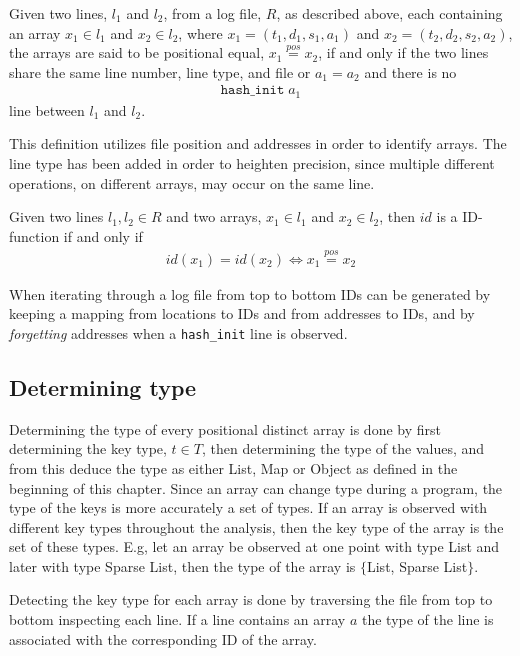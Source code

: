 \begin{definition}
Given two lines, $l_1$ and $l_2$, from a log file, $R$, as described above, each containing an array $x_1\in l_1$ and $x_2\in l_2$, where $x_1 = (t_1,d_1,s_1,a_1)$ and $x_2 = (t_2,d_2,s_2,a_2)$, the arrays are said to be positional equal, $x_1\stackrel{pos}{=} x_2$, if and only if the two lines share the same line number, line type, and file or $a_1 = a_2$ and there is no 
\begin{align*}
\texttt{hash\_init}\;a_1
\end{align*}
line between $l_1$ and $l_2$.
\end{definition}

This definition utilizes file position and addresses in order to identify arrays. The line type has been added in order to heighten precision, since multiple different operations, on different arrays, may occur on the same line. 

\begin{definition}
Given two lines $l_1, l_2\in R$ and two arrays, $x_1\in l_1$ and $x_2 \in l_2$, then $id$ is a ID-function if and only if
\begin{align*}
    id(x_1) = id(x_2) \Leftrightarrow x_1 \stackrel{pos}{=} x_2
\end{align*}
\end{definition}

When iterating through a log file from top to bottom IDs can be generated by keeping a mapping from locations to IDs and from addresses to IDs, and by \emph{forgetting} addresses when a \texttt{hash\_init} line is observed.

\subsection{Determining type}
Determining the type of every positional distinct array is done by first determining the key type, $t\in T$, then determining the type of the values, and from this deduce the type as either List, Map or Object as defined in the beginning of this chapter. Since an array can change type during a program, the type of the keys is more accurately a set of types. If an array is observed with different key types throughout the analysis, then the key type of the array is the set of these types. E.g, let an array be observed at one point with type List and later with type Sparse List, then the type of the array is $\{$List, Sparse List$\}$.

Detecting the key type for each array is done by traversing the file from top to bottom inspecting each line. If a line contains an array $a$ the type of the line is associated with the corresponding ID of the array.

